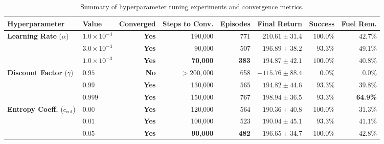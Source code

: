 \begin{table}[H]
    \centering
    \footnotesize
    \caption{Summary of hyperparameter tuning experiments and convergence metrics.}
    \label{tab:sensitivity_summary}
    \begin{tabular}{llrrrrrr}
        \toprule
        \textbf{Hyperparameter} & \textbf{Value}       & \textbf{Converged} & \textbf{Steps to Conv.} & \textbf{Episodes} & \textbf{Final Return} & \textbf{Success} & \textbf{Fuel Rem.} \\
        \midrule
        \multirow{3}{*}{\textbf{Learning Rate} ($\alpha$)}
                                & $1.0 \times 10^{-4}$ & \textbf{Yes}       & 190,000                 & 771               & $210.61 \pm 31.4$     & $100.0\%$        & $42.7\%$           \\
                                & $3.0 \times 10^{-4}$ & \textbf{Yes}       & 90,000                  & 507               & $196.89 \pm 38.2$     & $93.3\%$         & $49.1\%$           \\
                                & $1.0 \times 10^{-3}$ & \textbf{Yes}       & \textbf{70,000}         & \textbf{383}      & $194.87 \pm 42.1$     & $100.0\%$        & $40.8\%$           \\
        \midrule
        \multirow{3}{*}{\textbf{Discount Factor} ($\gamma$)}
                                & $0.95$               & \textbf{No}        & $>200,000$              & 658               & $-115.76 \pm 88.4$    & $0.0\%$          & $0.0\%$            \\
                                & $0.99$               & \textbf{Yes}       & 130,000                 & 565               & $194.82 \pm 44.6$     & $93.3\%$         & $39.8\%$           \\
                                & $0.999$              & \textbf{Yes}       & 150,000                 & 767               & $198.94 \pm 36.5$     & $93.3\%$         & \textbf{64.9\%}    \\
        \midrule
        \multirow{3}{*}{\textbf{Entropy Coeff.} ($c_{\text{ent}}$)}
                                & $0.00$               & \textbf{Yes}       & 120,000                 & 564               & $190.36 \pm 40.8$     & $100.0\%$        & $31.3\%$           \\
                                & $0.01$               & \textbf{Yes}       & 100,000                 & 523               & $190.04 \pm 45.1$     & $93.3\%$         & $41.1\%$           \\
                                & $0.05$               & \textbf{Yes}       & \textbf{90,000}         & \textbf{482}      & $196.65 \pm 34.7$     & $100.0\%$        & $42.8\%$           \\
        \bottomrule
    \end{tabular}
\end{table}

